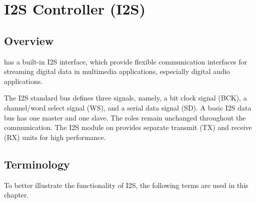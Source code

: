 \documentclass[main\_\_EN.tex]{subfiles}
\begin{document}

\ifglobal
\else
    {\let\clearpage\relax \listoftodos}
    {\let\clearpage\relax \listofdonetodos}
    \tableofcontents
\fi



\hypertarget{i2s}{}
\chapter{I2S Controller (I2S)}
\label{mod:i2s}

\section{Overview}

\chipname{} has a built-in I2S interface, which provide flexible communication interfaces for streaming digital data in multimedia applications, especially digital audio applications.

The I2S standard bus defines three signals, namely, a bit clock signal (BCK), a channel/word select signal (WS), and a serial data signal (SD). A basic I2S data bus has one master and one slave. The roles remain unchanged throughout the communication. The I2S module on \chipname{} provides separate transmit (TX) and receive (RX) units for high performance.

\section{Terminology}

To better illustrate the functionality of I2S, the following terms are used in this chapter. 
\end{document}
